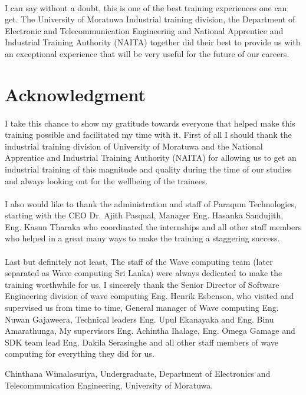 \paragraph{}
I can say without a doubt, this is one of the best training experiences one can get. The University of Moratuwa Industrial training division, the Department of Electronic and Telecommunication Engineering and National Apprentice and Industrial Training Authority (NAITA) together did their best to provide us with an exceptional experience that will be very useful for the future of our careers.

\newpage
\section*{Acknowledgment}

\paragraph{}
I take this chance to show my gratitude towards everyone that helped make this training possible and facilitated my time with it. First of all I should thank the industrial training division of University of Moratuwa and the National Apprentice and Industrial Training Authority (NAITA) for allowing us to get an industrial training of this magnitude and quality during the time of our studies and always looking out for the wellbeing of the trainees.

\paragraph{}
I also would like to thank the administration and staff of Paraqum Technologies, starting with the CEO Dr. Ajith Pasqual, Manager Eng. Hasanka Sandujith, Eng. Kasun Tharaka who coordinated the internships and all other staff members who helped in a great many ways to make the training a staggering success. 

\paragraph{}
Last but definitely not least, The staff of the Wave computing team (later separated as Wave computing Sri Lanka) were always dedicated to make the training worthwhile for us. I sincerely thank the Senior Director of Software Engineering division of wave computing Eng. Henrik Esbenson, who visited and supervised us from time to time, General manager of Wave computing Eng. Nuwan Gajaweera, Technical leaders Eng. Upul Ekanayaka and Eng. Binu Amarathunga, My supervisors Eng. Achintha Ihalage, Eng. Omega Gamage and SDK team lead Eng. Dakila Serasinghe and all other staff members of wave computing for everything they did for us.

\vspace*{3cm}

\noindent Chinthana Wimalasuriya,\newline
Undergraduate,\newline
Department of Electronics and Telecommunication Engineering,\newline
University of Moratuwa.
